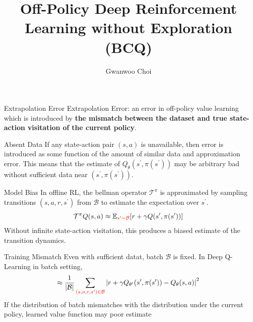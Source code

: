 \documentclass[11pt]{beamer}
\title{Off-Policy Deep Reinforcement Learning without Exploration (BCQ)}
\author{Gwanwoo Choi}
\newcommand{\mbb}[1]{\mathbb{#1}}
\newcommand{\mc}[1]{\mathcal{#1}}
\newcommand{\tb}[1]{\textbf{#1}}
\newcommand{\abs}[1]{\left\lvert #1 \right\rvert}
\begin{document}

\begin{frame}
    \titlepage
\end{frame}





\begin{frame}{Extrapolation Error}
    Extrapolation Error: an error in off-policy value learning which is introduced by \tb{the mismatch between the dataset and true state-action visitation of the current policy}.

    \begin{block}{Absent Data}
        If any state-action pair $(s,a)$ is unavailable, then error is introduced as some function of the amount of similar data and approximation error.
        This means that the estimate of $Q_\theta(s^\prime, \pi(s^\prime))$ may be arbitrary bad without sufficient data near $(s^\prime, \pi(s^\prime))$.
    \end{block}

    \begin{block}{Model Bias}
        In offline RL, the bellman operator $\mc{T}^\pi$ is approximated by sampling transitions $(s,a,r,s^\prime)$ from $\mc{B}$ to estimate the expectation over $s^\prime$.
        \[
            \mc{T}^\pi Q (s,a) \approx \mbb{E}_{\textcolor{red}{s^\prime \sim \mc{B}}}[r + \gamma Q(s^\prime, \pi(s^\prime))]
        \]
        Without infinite state-action visitation, this produces a biased estimate of the transition dynamics.
    \end{block}

    \begin{block}{Training Mismatch}
        Even with sufficient datat, batch $\mc{B}$ is fixed.
        In Deep Q-Learning in batch setting,
        \[
            \approx \frac{1}{\abs{\mc{B}}} \sum_{\textcolor{red}{(s,a,r,s^\prime) \in \mc{B}}} \abs{r + \gamma Q_{\theta^\prime}(s^\prime, \pi(s^\prime)) - Q_\theta (s,a)}^2
        \]
        If the distribution of batch mismatches with the distribution under the current policy, learned value function may poor estimate
    \end{block}
\end{frame}
\end{document}
